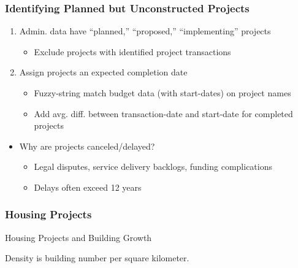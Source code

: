 \documentclass[aspectratio=149]{beamer}
\begin{document}
\begin{frame}
\begin{tikzpicture}[overlay]
\end{tikzpicture}

\end{frame}







\begin{frame}
\frametitle{Identifying Planned but Unconstructed Projects}

\begin{enumerate}
  \item Admin. data have ``planned,'' ``proposed,'' ``implementing'' projects
    \begin{itemize}
      \item Exclude projects with identified project transactions
    \end{itemize}

    \vspace{.2cm}

  \item Assign projects an expected completion date
    \begin{itemize}
      \item Fuzzy-string match budget data (with start-dates) on project names
      \item Add avg. diff. between transaction-date and start-date for completed projects
    \end{itemize}
\end{enumerate}

\begin{itemize}
  \item Why are projects canceled/delayed? 
    \begin{itemize}
      \item Legal disputes, service delivery backlogs, funding complications
      \item Delays often exceed 12 years 
    \end{itemize} 
\end{itemize}

\end{frame}



\begin{frame}
\frametitle{Housing Projects}
\begin{table}
\caption{Housing Projects and Building Growth}

\end{table}
\vspace{.2cm} 
Density is building number per square kilometer.
\end{frame}
\end{document}
